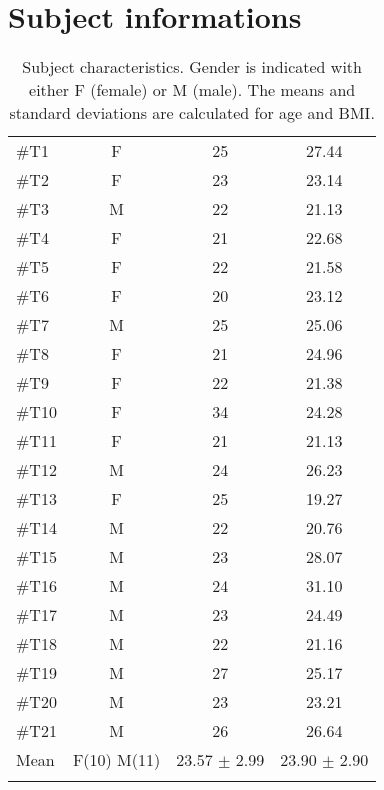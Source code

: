\section{Subject informations} \label{sec:SubjectINFO}
\begin{longtable}{l|c|c|c}
	\rowcolor[HTML]{C0C0C0} \rule{0pt}{3ex}  \color[HTML]{000000}{Subject} & \color[HTML]{000000}{Gender} & \color[HTML]{000000}{Age} &  \color[HTML]{000000}{BMI} 
	\\ \hline \rule{0pt}{3ex} 
\#T1 & F  & 25  & 27.44  \\ \hline \hline \rule{0pt}{3ex} 
\#T2 & F & 23 & 23.14  \\ \hline \hline \rule{0pt}{3ex} 
\#T3 & M & 22 & 21.13  \\ \hline \hline \rule{0pt}{3ex} 
\#T4 & F & 21  & 22.68  \\ \hline \hline \rule{0pt}{3ex} 
\#T5 & F & 22 & 21.58   \\ \hline \hline \rule{0pt}{3ex} 
\#T6 & F & 20 & 23.12 \\ \hline \hline \rule{0pt}{3ex} 
\#T7 & M & 25  & 25.06  \\ \hline \hline \rule{0pt}{3ex} 
	\#T8 & F & 21 & 24.96  \\ \hline \hline \rule{0pt}{3ex} 
	\#T9 & F & 22 & 21.38   \\ \hline \hline \rule{0pt}{3ex} 
	\#T10 & F & 34 & 24.28  \\ \hline \hline \rule{0pt}{3ex} 
	\#T11 & F & 21 & 21.13 \\ \hline \hline \rule{0pt}{3ex} 
\#T12 & M  & 24  & 26.23\\ \hline \hline \rule{0pt}{3ex} 
\#T13 &  F & 25 & 19.27 \\ \hline \hline \rule{0pt}{3ex} 
\#T14 & M  & 22 & 20.76  \\ \hline \hline \rule{0pt}{3ex} 
\#T15 & M & 23 & 28.07  \\ \hline \hline \rule{0pt}{3ex} 
\#T16 & M & 24 & 31.10 \\ \hline \hline \rule{0pt}{3ex} 
\#T17 & M & 23 & 24.49  \\ \hline \hline \rule{0pt}{3ex} 
	\#T18 & M & 22 & 21.16 \\ \hline \hline \rule{0pt}{3ex} 
	\#T19 & M & 27 & 25.17 \\ \hline \hline \rule{0pt}{3ex} 
	\#T20 & M & 23  & 23.21  \\ \hline \hline \rule{0pt}{3ex}
		\#T21 & M & 26 & 26.64   \\ \hline \hline \rule{0pt}{3ex} 
	Mean & F(10) M(11) & 23.57 $\pm$ 2.99  & 23.90 $\pm$ 2.90
	\\ \hline 
	\caption{Subject characteristics. Gender is indicated with either F (female) or M (male). The means and standard deviations are calculated for age and BMI.}
	\label{tab:subjects}
\end{longtable}
\vspace{-.5cm}


